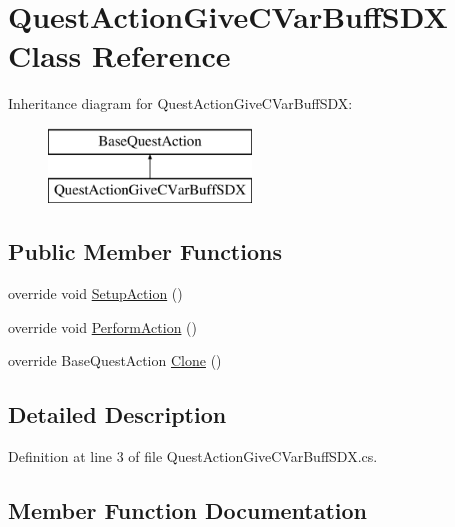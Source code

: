 \hypertarget{class_quest_action_give_c_var_buff_s_d_x}{}\section{Quest\+Action\+Give\+C\+Var\+Buff\+S\+DX Class Reference}
\label{class_quest_action_give_c_var_buff_s_d_x}
Inheritance diagram for Quest\+Action\+Give\+C\+Var\+Buff\+S\+DX\+:\begin{figure}[H]
\begin{center}
\leavevmode
\includegraphics[height=2.000000cm]{class_quest_action_give_c_var_buff_s_d_x}
\end{center}
\end{figure}
\subsection*{Public Member Functions}
\begin{DoxyCompactItemize}
\item 
override void \mbox{\hyperlink{class_quest_action_give_c_var_buff_s_d_x_a90630f27779caea686e2e3b00a8351d4}{Setup\+Action}} ()
\item 
override void \mbox{\hyperlink{class_quest_action_give_c_var_buff_s_d_x_a3ec449161980f4e59b59ace54d45a3a3}{Perform\+Action}} ()
\item 
override Base\+Quest\+Action \mbox{\hyperlink{class_quest_action_give_c_var_buff_s_d_x_a25e5a999286cefbb1fde7c00acd5a223}{Clone}} ()
\end{DoxyCompactItemize}


\subsection{Detailed Description}


Definition at line 3 of file Quest\+Action\+Give\+C\+Var\+Buff\+S\+D\+X.\+cs.



\subsection{Member Function Documentation}
\mbox{\label{class_quest_action_give_c_var_buff_s_d_x_a25e5a999286cefbb1fde7c00acd5a223}} 
